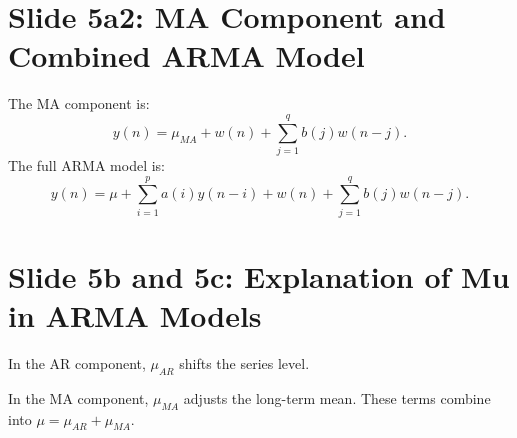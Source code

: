 \documentclass[12pt]{article}
\begin{document}
\section*{Slide 5a2: MA Component and Combined ARMA Model}
The MA component is:
\[
y(n) = \mu_{MA} + w(n) + \sum_{j=1}^{q} b(j) w(n-j).
\]
The full ARMA model is:
\[
y(n) = \mu + \sum_{i=1}^{p} a(i) y(n-i) + w(n) + \sum_{j=1}^{q} b(j) w(n-j).
\]

\section*{Slide 5b and 5c: Explanation of Mu in ARMA Models}
In the AR component, \( \mu_{AR} \) shifts the series level.

In the MA component, \( \mu_{MA} \) adjusts the long-term mean. These terms combine into \( \mu = \mu_{AR} + \mu_{MA} \).
\end{document}
